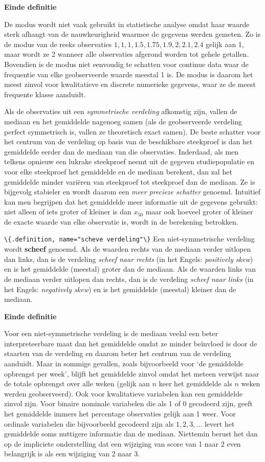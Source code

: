 \documentclass[
  12pt,dutch,coursenotes]{book}
\newcommand{\passthrough}[1]{#1}
\begin{document}
\textbf{Einde definitie}

De modus wordt niet vaak gebruikt in statistische analyse omdat haar waarde
sterk afhangt van de nauwkeurigheid waarmee de gegevens werden gemeten. Zo
is de modus van de reeks observaties \(1, 1, 1, 1.5, 1.75, 1.9, 2, 2.1, 2.4\)
gelijk aan 1, maar wordt ze 2 wanneer alle observaties afgerond worden tot
gehele getallen. Bovendien is de modus niet eenvoudig te schatten voor
continue data waar de frequentie van elke geobserveerde waarde meestal 1 is.
De modus is daarom het meest zinvol voor kwalitatieve en discrete numerieke
gegevens, waar ze de meest frequente klasse aanduidt.

Als de observaties uit een \emph{symmetrische verdeling} afkomstig zijn,
vallen de mediaan en het gemiddelde nagenoeg samen (als de geobserveerde
verdeling perfect symmetrisch is, vallen ze theoretisch exact samen).
De beste schatter voor het centrum van de verdeling op basis van de beschikbare
steekproef is dan het gemiddelde eerder dan de mediaan van die observaties.
Inderdaad, als men telkens opnieuw een lukrake steekproef neemt uit de
gegeven studiepopulatie en voor elke steekproef het gemiddelde en de mediaan
berekent, dan zal het gemiddelde minder variëren van steekproef tot
steekproef dan de mediaan. Ze is bijgevolg stabieler en wordt daarom een
\emph{meer precieze schatter} genoemd. Intuïtief kan men begrijpen dat
het gemiddelde meer informatie uit de gegevens gebruikt: niet alleen of iets
groter of kleiner is dan \(x_{50}\) maar ook hoeveel groter of kleiner de
exacte waarde van elke observatie is, wordt in de berekening betrokken.

\passthrough{\lstinline!\{.definition, name="scheve verdeling"\}!}
Een niet-symmetrische verdeling wordt \textbf{scheef} genoemd. Als de
waarden rechts van de mediaan verder uitlopen dan links, dan is de verdeling
\emph{scheef naar rechts} (in het Engels: \emph{positively skew}) en is
het gemiddelde (meestal) groter dan de mediaan. Als de waarden links van de
mediaan verder uitlopen dan rechts, dan is de verdeling \emph{scheef naar
links} (in het Engels: \emph{negatively skew}) en is het gemiddelde
(meestal) kleiner dan de mediaan.

\textbf{Einde definitie}

Voor een niet-symmetrische verdeling is de mediaan veelal een beter
interpreteerbare maat dan het gemiddelde omdat ze minder beïnvloed is
door de staarten van de verdeling en daarom beter het centrum van de
verdeling aanduidt. Maar in sommige gevallen, zoals bijvoorbeeld voor `de
gemiddelde opbrengst per week', blijft het gemiddelde zinvol omdat het
meteen verwijst naar de totale opbrengst over alle weken (gelijk aan \(n\)
keer het gemiddelde als \(n\) weken werden geobserveerd). Ook voor
kwalitatieve variabelen kan een gemiddelde zinvol zijn. Voor binaire
nominale variabelen die als 1 of 0 gecodeerd zijn, geeft het gemiddelde
immers het percentage observaties gelijk aan 1 weer. Voor ordinale
variabelen die bijvoorbeeld gecodeerd zijn als \(1, 2, 3, ...\) levert het
gemiddelde soms nuttigere informatie dan de mediaan. Niettemin berust het
dan op de impliciete onderstelling dat een wijziging van score van 1 naar 2
even belangrijk is als een wijziging van 2 naar 3.
\end{document}
